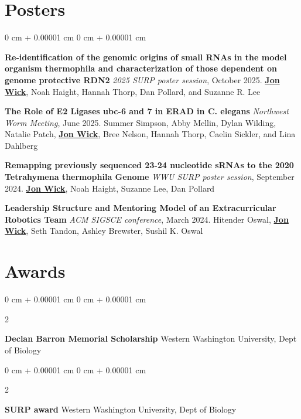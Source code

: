 \documentclass[10pt, article]{article}
\newenvironment{onecolentry}{
    \begin{adjustwidth}{
        0 cm + 0.00001 cm
    }{
        0 cm + 0.00001 cm
    }
}{
    \end{adjustwidth}
} %
\newenvironment{twocolentry}[2][]{
    \onecolentry
    \def\secondColumn{#2}
    \setcolumnwidth{\fill, 4.5 cm}
    \begin{paracol}{2}
}{
    \switchcolumn \raggedleft \secondColumn
    \end{paracol}
    \endonecolentry
} %
\begin{document}
    \section{Posters}





        \begin{onecolentry}
           \textbf{Re-identification of the genomic origins of small RNAs in the model organism  thermophila and characterization of those dependent on genome protective RDN2} \newline
          \textit{2025 SURP poster session}, October 2025.\newline
            \underline{\textbf{Jon Wick}}, Noah Haight, Hannah Thorp, Dan Pollard, and Suzanne R. Lee
         
           \vspace{0.2cm}

           \textbf{The Role of E2 Ligases ubc-6 and 7 in ERAD in C. elegans} \newline
          \textit{Northwest Worm Meeting}, June 2025.\newline
            Summer Simpson, Abby Mellin, Dylan Wilding, Natalie Patch, \underline{\textbf{Jon Wick}}, Bree Nelson, Hannah Thorp, Caelin Sickler, and Lina Dahlberg
         
           \vspace{0.2cm}

          \textbf{Remapping previously sequenced 23-24 nucleotide sRNAs to the 2020 Tetrahymena thermophila Genome}\newline
          \textit{WWU SURP poster session}, September 2024. \newline
          \underline{\textbf{Jon Wick}}, Noah Haight, Suzanne Lee, Dan Pollard

          \vspace{0.2cm}

          \textbf{Leadership Structure and Mentoring Model of an Extracurricular Robotics Team} \newline
          \textit{ACM SIGSCE conference}, March 2024.\newline
          Hitender Oswal, \underline{\textbf{Jon Wick}}, Seth Tandon, Ashley Brewster, Sushil K. Oswal



        \end{onecolentry}

    \section{Awards}
    \begin{twocolentry}
      {2025}
      \textbf{Declan Barron Memorial Scholarship} \newline
      Western Washington University, Dept of Biology
    \end{twocolentry}
    \begin{twocolentry}
      {2025}
      \textbf{SURP award} \newline
      Western Washington University, Dept of Biology
    \end{twocolentry}
\end{document}

